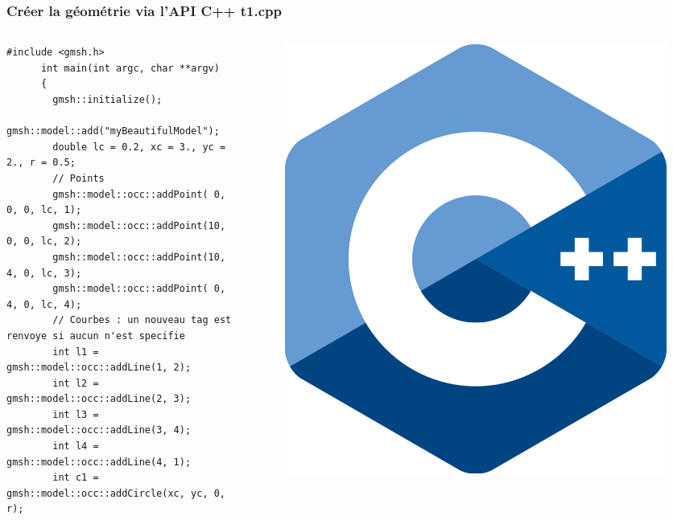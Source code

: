 \documentclass[aspectratio=169]{beamer}
\begin{document}
\begin{frame}[fragile]
\frametitle{Créer la géométrie via l'API C++ \hfill t1.cpp}
  \footnotesize
  \begin{columns}
    \begin{column}{0.9\linewidth}
      \begin{lstlisting}[frame=none, aboveskip=1mm]
      #include <gmsh.h>
      int main(int argc, char **argv)
      {
        gmsh::initialize();
        gmsh::model::add("myBeautifulModel");
        double lc = 0.2, xc = 3., yc = 2., r = 0.5;
        // Points
        gmsh::model::occ::addPoint( 0, 0, 0, lc, 1);
        gmsh::model::occ::addPoint(10, 0, 0, lc, 2);
        gmsh::model::occ::addPoint(10, 4, 0, lc, 3);
        gmsh::model::occ::addPoint( 0, 4, 0, lc, 4);
        // Courbes : un nouveau tag est renvoye si aucun n'est specifie
        int l1 = gmsh::model::occ::addLine(1, 2);
        int l2 = gmsh::model::occ::addLine(2, 3);
        int l3 = gmsh::model::occ::addLine(3, 4);
        int l4 = gmsh::model::occ::addLine(4, 1);
        int c1 = gmsh::model::occ::addCircle(xc, yc, 0, r);
      \end{lstlisting}
    \end{column}
    \begin{column}{0.9\linewidth}
      \begin{figure}
        \vspace{-5.5cm}
        \hspace{-8cm}
        \includegraphics[width=0.1\linewidth]{figures/cpp.png}
        \caption{}
        \label{}
      \end{figure}
    \end{column}
  \end{columns}
\end{frame}
\end{document}
